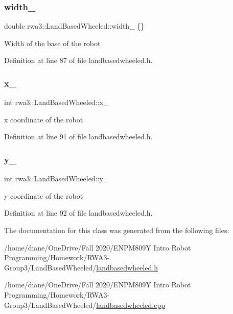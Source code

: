 \subsubsection{\texorpdfstring{width\+\_\+}{width\_}}
{\footnotesize\ttfamily double rwa3\+::\+Land\+Based\+Wheeled\+::width\+\_\+ \{\}\hspace{0.3cm}{\ttfamily [protected]}}

Width of the base of the robot 

Definition at line 87 of file landbasedwheeled.\+h.

\mbox{\label{classrwa3_1_1_land_based_wheeled_a89b4d09a70e5112f1bb7fbee55b660a6}} 
\subsubsection{\texorpdfstring{x\+\_\+}{x\_}}
{\footnotesize\ttfamily int rwa3\+::\+Land\+Based\+Wheeled\+::x\+\_\+\hspace{0.3cm}{\ttfamily [protected]}}

x coordinate of the robot 

Definition at line 91 of file landbasedwheeled.\+h.

\mbox{\label{classrwa3_1_1_land_based_wheeled_a553ac2a1ede03b35820f0200a7606f8e}} 
\subsubsection{\texorpdfstring{y\+\_\+}{y\_}}
{\footnotesize\ttfamily int rwa3\+::\+Land\+Based\+Wheeled\+::y\+\_\+\hspace{0.3cm}{\ttfamily [protected]}}

y coordinate of the robot 

Definition at line 92 of file landbasedwheeled.\+h.



The documentation for this class was generated from the following files\+:\begin{DoxyCompactItemize}
\item 
/home/diane/\+One\+Drive/\+Fall 2020/\+E\+N\+P\+M809\+Y Intro Robot Programming/\+Homework/\+R\+W\+A3-\/\+Group3/\+Land\+Based\+Wheeled/\hyperlink{landbasedwheeled_8h}{landbasedwheeled.\+h}\item 
/home/diane/\+One\+Drive/\+Fall 2020/\+E\+N\+P\+M809\+Y Intro Robot Programming/\+Homework/\+R\+W\+A3-\/\+Group3/\+Land\+Based\+Wheeled/\hyperlink{landbasedwheeled_8cpp}{landbasedwheeled.\+cpp}\end{DoxyCompactItemize}

